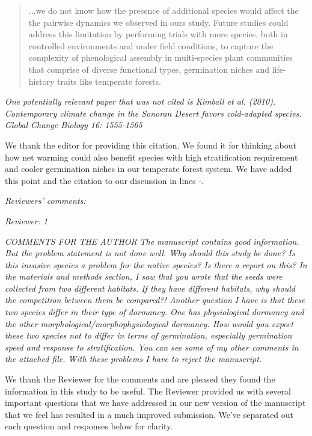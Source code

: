 \documentclass[11pt]{article}
\begin{document}
\begin{quote}...we do not know how the presence of additional species would affect the the pairwise dynamics we observed in ours study. Future studies could address this limitation by performing trials with more species, both in controlled environments and under field conditions, to capture the complexity of phenological assembly in multi-species plant communities that comprise of diverse functional types, germination niches and life-history traits like temperate forests.\end{quote}

\emph{One potentially relevant paper that was not cited is Kimball et al. (2010). Contemporary climate change in the Sonoran Desert favors cold-adapted species. Global Change Biology 16: 1555-1565}

We thank the editor for providing this citation. We found it for thinking about how net warming could also benefit species with high stratification requirement and cooler germination niches in our temperate forest system. We have added this point and the citation to our discussion in lines -.

\emph{Reviewers’ comments:}

\emph{Reviewer: 1}

\emph{COMMENTS FOR THE AUTHOR}
\emph{The manuscript contains good information. But the problem statement is not done well. Why should this study be done? Is this invasive species a problem for the native species? Is there a report on this? In the materials and methods section, I saw that you wrote that the seeds were collected from two different habitats. If they have different habitats, why should the competition between them be compared?! Another question I have is that these two species differ in their type of dormancy. One has physiological dormancy and the other morphological/morphophysiological dormancy. How would you expect these two species not to differ in terms of germination, especially germination speed and response to stratification. You can see some of my other comments in the attached file. With these problems I have to reject the manuscript.}

We thank the Reviewer for the comments and are pleased they found the information in this study to be useful. The Reviewer provided us with several important questions that we have addressed in our new version of the manuscript that we feel has resulted in a much improved submission. We've separated out each question and responses below for clarity.
\end{document}
